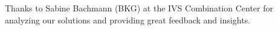 \documentclass[twocolumn,twoside]{svmultivs_gm} %
\begin{document}
Thanks to Sabine Bachmann (BKG) at the IVS Combination Center for analyzing our solutions and providing
great feedback and insights.
%
%
%
%
\end{document}
